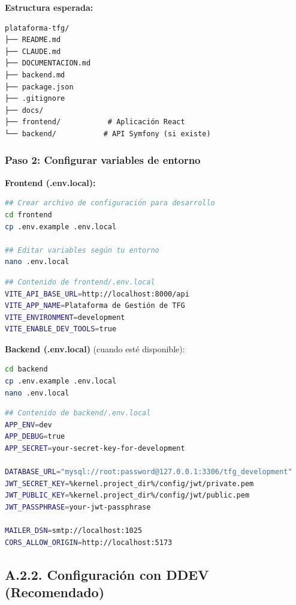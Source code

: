 \documentclass[12pt,a4paper,oneside]{report}
\begin{document}
\textbf{Estructura esperada:}

\begin{lstlisting}
plataforma-tfg/
├── README.md
├── CLAUDE.md
├── DOCUMENTACION.md
├── backend.md
├── package.json
├── .gitignore
├── docs/
├── frontend/           # Aplicación React
└── backend/           # API Symfony (si existe)
\end{lstlisting}

\subsubsection{Paso 2: Configurar variables de
entorno}\label{paso-2-configurar-variables-de-entorno}

\textbf{Frontend (.env.local):}

\begin{lstlisting}[language=bash]
## Crear archivo de configuración para desarrollo
cd frontend
cp .env.example .env.local

## Editar variables según tu entorno
nano .env.local
\end{lstlisting}

\begin{lstlisting}[language=bash]
## Contenido de frontend/.env.local
VITE_API_BASE_URL=http://localhost:8000/api
VITE_APP_NAME=Plataforma de Gestión de TFG
VITE_ENVIRONMENT=development
VITE_ENABLE_DEV_TOOLS=true
\end{lstlisting}

\textbf{Backend (.env.local)} (cuando esté disponible):

\begin{lstlisting}[language=bash]
cd backend
cp .env.example .env.local
nano .env.local
\end{lstlisting}

\begin{lstlisting}[language=bash]
## Contenido de backend/.env.local
APP_ENV=dev
APP_DEBUG=true
APP_SECRET=your-secret-key-for-development

DATABASE_URL="mysql://root:password@127.0.0.1:3306/tfg_development"
JWT_SECRET_KEY=%kernel.project_dir%/config/jwt/private.pem
JWT_PUBLIC_KEY=%kernel.project_dir%/config/jwt/public.pem
JWT_PASSPHRASE=your-jwt-passphrase

MAILER_DSN=smtp://localhost:1025
CORS_ALLOW_ORIGIN=http://localhost:5173
\end{lstlisting}

\subsection{A.2.2. Configuración con DDEV
(Recomendado)}\label{a.2.2.-configuraciuxf3n-con-ddev-recomendado}
\end{document}
